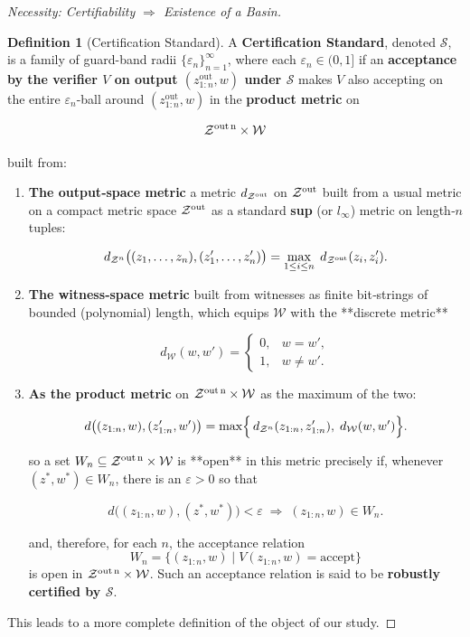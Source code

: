 \documentclass[12pt]{article}
\theoremstyle{definition}
\newtheorem{definition}{Definition}[section]
\theoremstyle{plain}
\begin{document}
\begin{proof}[Necessity: Certifiability $\Rightarrow$ Existence of a Basin]
\begin{definition}[Certification Standard]
\label{def:certification-standard}
A \textbf{Certification Standard}, denoted $\mathcal{S}$, is a family of guard-band radii $\{\varepsilon_n\}_{n=1}^\infty$, where each $\varepsilon_n \in (0, 1]$ if an \textbf{acceptance by the verifier $V$ on output $(z^{\text{out}}_{1:n}, w)$ under $\mathcal{S}$} makes $V$ also accepting on the entire $\varepsilon_n$-ball around $(z^{\text{out}}_{1:n}, w)$ in the \textbf{product metric} on

$$
\mathcal Z^{\rm out\,n}\times\mathcal W
$$

built from:
\begin{enumerate}
    \item \textbf{The output‐space metric}
   a metric $d_{\mathcal Z^{\rm out}}$ on $\mathcal Z^{\rm out}$ built from a usual metric on a compact metric space $\mathcal Z^{\rm out}$ as a standard \textbf{sup} (or $\textit{l}_{\infty}$) metric on length‑$n$ tuples:

   $$
     d_{\mathcal Z^n}\bigl((z_1,\dots,z_n),(z'_1,\dots,z'_n)\bigr)
     = \max_{1\le i\le n}\;d_{\mathcal Z^{\rm out}}(z_i,z'_i).
   $$

    \item \textbf{The witness‐space metric}
   built from witnesses as finite bit‐strings of bounded (polynomial) length, which equips $\mathcal W$ with the **discrete metric**

   $$
     d_{\mathcal W}(w,w') =
     \begin{cases}
       0, & w = w',\\
       1, & w \neq w'.
     \end{cases}
   $$
    \item \textbf{As the product metric}
    on $\mathcal Z^{\rm out\,n}\times\mathcal W$ as the maximum of the two:

   $$
     d\bigl((z_{1:n},w),(z'_{1:n},w')\bigr)
     = \max\Bigl\{\,d_{\mathcal Z^n}(z_{1:n},z'_{1:n}),\;d_{\mathcal W}(w,w')\Bigr\}.
   $$

so a set $W_n\subseteq\mathcal Z^{\rm out\,n}\times\mathcal W$ is **open** in this metric precisely if, whenever $(z^*,w^*)\in W_n$, there is an $\varepsilon>0$ so that

$$
  d\bigl((z_{1:n},w),(z^*,w^*)\bigr)<\varepsilon
  \;\Longrightarrow\;
  (z_{1:n},w)\in W_n.
$$

and, therefore, for each $n$, the acceptance relation
$$
W_n = \{(z_{1:n},w)\mid V(z_{1:n},w)=\text{accept}\}
$$
is open in $\mathcal Z^{\rm out\,n}\times\mathcal W$. Such an acceptance relation is said to be \textbf{robustly certified by $\mathcal{S}$}.
\end{enumerate}
\end{definition}
This leads to a more complete definition of the object of our study.


\end{proof}
\end{document}
